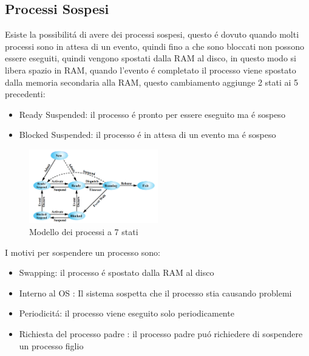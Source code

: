 \subsection{Processi Sospesi}
Esiste la possibilitá di avere dei processi sospesi, questo é dovuto quando molti processi sono in attesa di un evento,
quindi fino a che sono bloccati non possono essere eseguiti, quindi vengono spostati dalla RAM al disco, in questo modo
si libera spazio in RAM, quando l'evento é completato il processo viene spostato dalla memoria secondaria alla RAM,
questo cambiamento aggiunge 2 stati ai 5 precedenti:
\begin{itemize}
    \item Ready Suspended: il processo é pronto per essere eseguito ma é sospeso
    \item Blocked Suspended: il processo é in attesa di un evento ma é sospeso
\end{itemize}
\begin{figure}
    \centering
    \includegraphics[width=0.5\textwidth]{immagini/7State}
    \caption{Modello dei processi a 7 stati}
\end{figure}
I motivi per sospendere un processo sono:
\begin{itemize}
    \item Swapping: il processo é spostato dalla RAM al disco
    \item Interno al OS : Il sistema sospetta che il processo stia causando problemi
    \item Periodicitá: il processo viene eseguito solo periodicamente
    \item Richiesta del processo padre : il processo padre puó richiedere di sospendere un processo figlio
\end{itemize}

